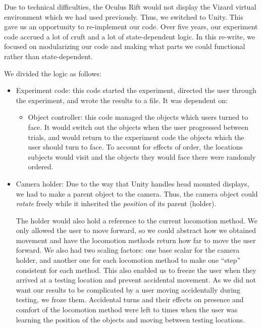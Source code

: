 \documentclass[titlepage]{article}
\theoremstyle{definition}
\theoremstyle{proof}
\begin{document}
Due to technical difficulties,
the Oculus Rift would not display the Vizard virtual environment
which we had used previously.
Thus, we switched to Unity.
This gave us an opportunity to re-implement our code.
Over five years, our experiment code accrued a lot of cruft and a lot of state-dependent logic.
In this re-write, we focused on modularizing our code
and making what parts we could functional rather than state-dependent.

We divided the logic as follows:
\begin{itemize}
\item Experiment code:
  this code started the experiment,
  directed the user through the experiment,
  and wrote the results to a file.
  It was dependent on:
  \begin{itemize}
  \item Object controller:
    this code managed the objects which users turned to face.
    It would switch out the objects when the user progressed between trials,
    and would return to the experiment code the objects which the user should turn to face.
    To account for effects of order, the locations subjects would visit and the objects they would face there
    were randomly ordered.
  \end{itemize}
\item Camera holder:
  Due to the way that Unity handles head mounted displays,
  we had to make a parent object to the camera.
  Thus, the camera object could \emph{rotate} freely
  while it inherited the \emph{position} of its parent (holder).

  The holder would also hold a reference to the current locomotion method.
  We only allowed the user to move forward,
  so we could abstract how we obtained movement
  and have the locomotion methods return how far to move the user forward.
  We also had two scaling factors:
  one base scalar for the camera holder,
  and another one for each locomotion method to make one ``step''
  consistent for each method.
  This also enabled us to freeze the user when they arrived at a testing location
  and prevent accidental movement.
  As we did not want our results to be complicated by a user moving accidentally during testing,
  we froze them.
  Accidental turns and their effects on presence and comfort of the locomotion method
  were left to times when the user was learning the position of the objects and moving between testing locations.
\end{itemize}
\end{document}
